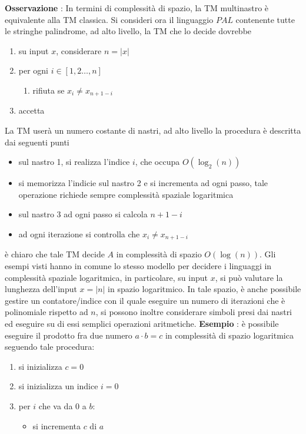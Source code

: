 \documentclass[10pt, letterpaper]{report}
\begin{document}
\textbf{Osservazione} : In termini di complessità di spazio, la TM multinastro è equivalente alla TM classica.\acc 
Si consideri ora il linguaggio $PAL$ contenente tutte le stringhe palindrome, ad alto livello, la TM che lo decide dovrebbe\begin{enumerate}
    \item su input $x$, considerare $n=|x|$
    \item per ogni $i\in[1,2 \dots , n]$\begin{enumerate}
        \item rifiuta se $x_i\ne x_{n+1-i}$
    \end{enumerate}
    \item accetta
\end{enumerate}
La TM userà un numero costante di nastri, ad alto livello la procedura è descritta dai seguenti punti\begin{itemize}
    \item sul nastro 1, si realizza l'indice $i$, che occupa $O(\log_2(n))$
    \item si memorizza l'indicie sul nastro 2 e si incrementa ad ogni passo, tale operazione richiede sempre complessità spaziale logaritmica 
    \item sul nastro 3 ad ogni passo si calcola $n+1-i$
    \item ad ogni iterazione si controlla che $x_i\ne x_{n+1-i}$
\end{itemize}
è chiaro che tale TM decide $A$ in complessità di spazio $O(\log(n))$.\acc 
Gli esempi visti hanno in comune lo stesso modello per decidere i linguaggi in complessità spaziale logaritmica, in particolare, su input $x$, si può valutare la lunghezza dell'input $x=|n|$ in spazio logaritmico. \acc 
In tale spazio, è anche possibile gestire un contatore/indice con il quale eseguire un numero di iterazioni che è polinomiale rispetto ad $n$, si possono inoltre considerare simboli presi dai nastri ed eseguire su di essi semplici operazioni aritmetiche.\acc 
\textbf{Esempio} : è possibile eseguire il prodotto fra due numero $a\cdot b = c$ in complessità di spazio logaritmica seguendo tale procedura:\begin{enumerate}
    \item si inizializza $c=0$
    \item si inizializza un indice $i=0$
    \item per $i$ che va da $0$ a $b$:\begin{itemize}
        \item si incrementa  $c$ di $a$
    \end{itemize}
\end{enumerate}
\end{document}
